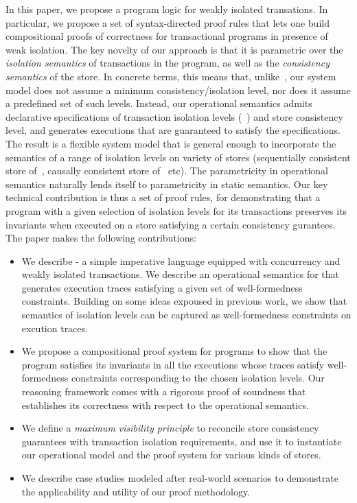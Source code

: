 In this paper, we propose a program logic for weakly isolated
transations. In particular, we propose a set of syntax-directed proof
rules that lets one build compositional proofs of correctness for
transactional programs in presence of weak isolation. The key novelty
of our approach is that it is parametric over the \emph{isolation
semantics} of transactions in the program, as well as the
\emph{consistency semantics} of the store. In concrete terms, this
means that, unlike~\cite{gotsmanpopl16, redblueatc, ecinec}, our
system model does not assume a minimum consistency/isolation level,
nor does it assume a predefined set of such levels. Instead, our
operational semantics admits declarative specifications of transaction
isolation levels (\eg~\cite{pldi15,gotsmanconcur15}) and store
consistency level, and generates executions that are guaranteed to
satisfy the specifications. The result is a flexible system model that
is general enough to incorporate the semantics of a range of isolation
levels on variety of stores (\eg sequentially consistent store
of~\cite{adyaphd}, causally consistent store of~\cite{gotsmanpopl16}
etc). The parametricity in operational semantics naturally lends
itself to parametricity in static semantics. Our key technical
contribution is thus a set of proof rules, for demonstrating that a
program with a given selection of isolation levels for its
transactions preserves its invariants when executed on a store
satisfying a certain consistency gurantees. The paper makes the
following contributions:
\begin{itemize}
  \item We describe \txnimp - a simple imperative language equipped
  with concurrency and weakly isolated transactions. We describe an
  operational semantics for \txnimp that generates execution traces
  satisfying a given set of well-formedness constraints. Building on
  some ideas expoused in previous work, we show that semantics of
  isolation levels can be captured as well-formedness constraints on
  excution traces.
  \item We propose a compositional proof system for \txnimp programs
  to show that the program satisfies its invariants in all the
  executions whose traces satisfy well-formedness constraints
  corresponding to the chosen isolation levels. Our reasoning
  framework comes with a rigorous proof of soundness that establishes
  its correctness with respect to the operational semantics.
  \item We define a \emph{maximum visibility principle} to reconcile
  store consistency guarantees with transaction isolation requirements,
  and use it to instantiate our operational model and the proof system
  for various kinds of stores.
  \item We describe case studies modeled after real-world scenarios
  to demonstrate the applicability and utility of our proof
  methodology.
\end{itemize}

